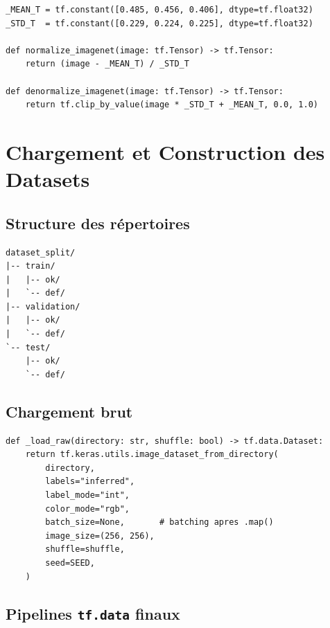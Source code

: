 \begin{lstlisting}[caption={Fonctions de normalisation et dénormalisation}]
_MEAN_T = tf.constant([0.485, 0.456, 0.406], dtype=tf.float32)
_STD_T  = tf.constant([0.229, 0.224, 0.225], dtype=tf.float32)

def normalize_imagenet(image: tf.Tensor) -> tf.Tensor:
    return (image - _MEAN_T) / _STD_T

def denormalize_imagenet(image: tf.Tensor) -> tf.Tensor:
    return tf.clip_by_value(image * _STD_T + _MEAN_T, 0.0, 1.0)
\end{lstlisting}

\section{Chargement et Construction des Datasets}

\subsection{Structure des répertoires}

\begin{verbatim}
dataset_split/
|-- train/
|   |-- ok/
|   `-- def/
|-- validation/
|   |-- ok/
|   `-- def/
`-- test/
    |-- ok/
    `-- def/
\end{verbatim}

\subsection{Chargement brut}

\begin{lstlisting}[caption={Chargement des images depuis les dossiers}]
def _load_raw(directory: str, shuffle: bool) -> tf.data.Dataset:
    return tf.keras.utils.image_dataset_from_directory(
        directory,
        labels="inferred",
        label_mode="int",
        color_mode="rgb",
        batch_size=None,       # batching apres .map()
        image_size=(256, 256),
        shuffle=shuffle,
        seed=SEED,
    )
\end{lstlisting}

\subsection{Pipelines \texttt{tf.data} finaux}

